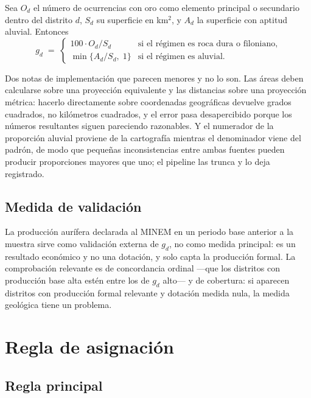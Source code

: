 \documentclass[11pt,a4paper]{article}
\begin{document}
Sea $O_d$ el número de ocurrencias con oro como elemento principal o secundario dentro del distrito $d$, $S_d$ su superficie en km$^2$, y $A_d$ la superficie con aptitud aluvial. Entonces
\begin{equation}
g_d \;=\;
\begin{cases}
100 \cdot O_d / S_d & \text{si el régimen es roca dura o filoniano,}\\[4pt]
\min\{A_d / S_d,\; 1\} & \text{si el régimen es aluvial.}
\end{cases}
\label{eq:gd}
\end{equation}

Dos notas de implementación que parecen menores y no lo son. Las áreas deben calcularse sobre una proyección equivalente y las distancias sobre una proyección métrica: hacerlo directamente sobre coordenadas geográficas devuelve grados cuadrados, no kilómetros cuadrados, y el error pasa desapercibido porque los números resultantes siguen pareciendo razonables. Y el numerador de la proporción aluvial proviene de la cartografía mientras el denominador viene del padrón, de modo que pequeñas inconsistencias entre ambas fuentes pueden producir proporciones mayores que uno; el pipeline las trunca y lo deja registrado.

\subsection{Medida de validación}

La producción aurífera declarada al MINEM en un periodo base anterior a la muestra sirve como validación externa de $g_d$, no como medida principal: es un resultado económico y no una dotación, y solo capta la producción formal. La comprobación relevante es de concordancia ordinal ---que los distritos con producción base alta estén entre los de $g_d$ alto--- y de cobertura: si aparecen distritos con producción formal relevante y dotación medida nula, la medida geológica tiene un problema.

\section{Regla de asignación}\label{sec:regla}

\subsection{Regla principal}
\end{document}
